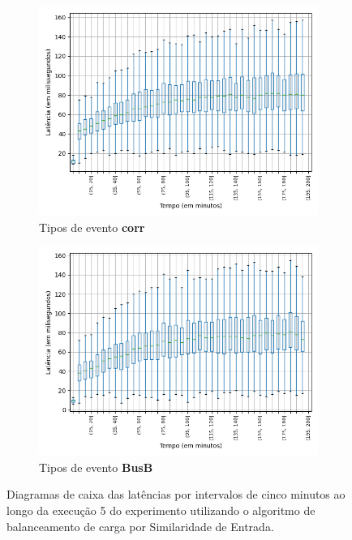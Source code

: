 \begin{figure}
\begin{subfigure}{.5\textwidth}
\centering
\includegraphics[width=\textwidth]{figuras/graphics/boxplot_10-dez-is_corr.png}
\caption{Tipos de evento \textbf{corr}}
\label{fig:BoxPlot_corr_IS_10-dez-is}
\end{subfigure}%
\begin{subfigure}{.5\textwidth}
\centering
\includegraphics[width=\textwidth]{figuras/graphics/boxplot_10-dez-is_busb.png}
\caption{Tipos de evento \textbf{BusB}}
\label{fig:BoxPlot_BusB_IS_10-dez-is}
\end{subfigure}%
\caption{Diagramas de caixa das latências por intervalos de cinco minutos ao longo da execução 5 do experimento utilizando o algoritmo de balanceamento de carga por Similaridade de Entrada.}
\end{figure}




